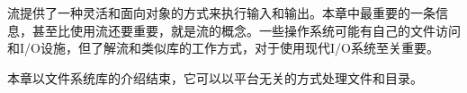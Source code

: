 流提供了一种灵活和面向对象的方式来执行输入和输出。本章中最重要的一条信息，甚至比使用流还要重要，就是流的概念。一些操作系统可能有自己的文件访问和I/O设施，但了解流和类似库的工作方式，对于使用现代I/O系统至关重要。

本章以文件系统库的介绍结束，它可以以平台无关的方式处理文件和目录。
